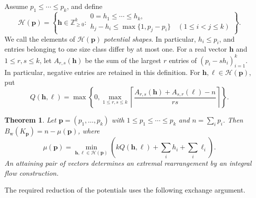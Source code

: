 \documentclass[11pt,reqno]{amsart}
\numberwithin{equation}{section}
\newtheorem{theorem}{Theorem}[section]
\theoremstyle{definition}
\theoremstyle{remark}
\begin{document}
Assume $p_1\le\cdots\le p_k$, and define
\begin{equation}\label{eq:mp:shapes}
 \mathcal H(\mathbf p)=\left\{\mathbf h\in\mathbb Z_{\ge0}^{k}:
 \begin{array}{l}
 0=h_1\le\cdots\le h_k,\\
 h_j-h_i\le\max\{1,p_j-p_i\}\quad(1\le i<j\le k)
 \end{array}\right\}.
\end{equation}
We call the elements of $\mathcal H(\mathbf p)$ \emph{potential shapes}.
In particular, $h_i\le p_i$, and entries belonging to one size class
differ by at most one.
For a real vector $\mathbf h$ and $1\le r,s\le k$, let
$A_{r,s}(\mathbf h)$ be the sum of the largest $r$ entries of
$(p_i-sh_i)_{i=1}^k$. In particular, negative entries are retained in
this definition. For $\mathbf h,\boldsymbol\ell\in\mathcal H(\mathbf p)$,
put
\begin{equation}\label{eq:mp:weak-Q}
 Q(\mathbf h,\boldsymbol\ell)=
 \max\left\{0,\max_{1\le r,s\le k}
 \left\lceil\frac{A_{r,s}(\mathbf h)+A_{s,r}(\boldsymbol\ell)-n}{rs}
 \right\rceil\right\}.
\end{equation}

\begin{theorem}\label{thm:mp:weak}
Let $\mathbf p=(p_1,\ldots,p_k)$ with $1\le p_1\le\cdots\le p_k$
and $n=\sum_i p_i$. Then $B_{\mathrm w}(K_{\mathbf p})=n-\mu(\mathbf p)$,
where
\begin{equation}\label{eq:mp:weak}
 \mu(\mathbf p)=
 \min_{\mathbf h,\boldsymbol\ell\in\mathcal H(\mathbf p)}
 \left(kQ(\mathbf h,\boldsymbol\ell)+\sum_i h_i+\sum_i\ell_i\right).
\end{equation}
An attaining pair of vectors determines an extremal rearrangement by
an integral flow construction.
\end{theorem}

The required reduction of the potentials uses the following exchange
argument.
\end{document}

